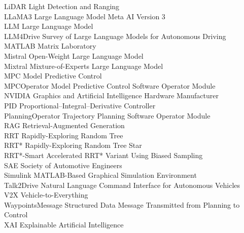 \documentclass[a4paper,12pt,one side]{report}
\theoremstyle{definition}
\begin{document}
\begin{tabbing}
LiDAR            \> Light Detection and Ranging \\[4pt]
LLaMA3           \> Large Language Model Meta AI Version 3 \\[4pt]
LLM              \> Large Language Model \\[4pt]
LLM4Drive        \> Survey of Large Language Models for Autonomous Driving \\[4pt]
MATLAB           \> Matrix Laboratory \\[4pt]
Mistral          \> Open-Weight Large Language Model \\[4pt]
Mixtral          \> Mixture-of-Experts Large Language Model \\[4pt]
MPC              \> Model Predictive Control \\[4pt]
MPCOperator      \> Model Predictive Control Software Operator Module \\[4pt]
NVIDIA           \> Graphics and Artificial Intelligence Hardware Manufacturer \\[4pt]
PID              \> Proportional--Integral--Derivative Controller \\[4pt]
PlanningOperator \> Trajectory Planning Software Operator Module \\[4pt]
RAG              \> Retrieval-Augmented Generation \\[4pt]
RRT              \> Rapidly-Exploring Random Tree \\[4pt]
RRT*             \> Rapidly-Exploring Random Tree Star \\[4pt]
RRT*-Smart       \> Accelerated RRT* Variant Using Biased Sampling \\[4pt]
SAE              \> Society of Automotive Engineers \\[4pt]
Simulink         \> MATLAB-Based Graphical Simulation Environment \\[4pt]
Talk2Drive       \> Natural Language Command Interface for Autonomous Vehicles \\[4pt]
V2X              \> Vehicle-to-Everything \\[4pt]
WaypointsMessage \> Structured Data Message Transmitted from Planning to Control \\[4pt]
XAI              \> Explainable Artificial Intelligence \\[4pt]
\end{tabbing}


\newpage
{}
\end{document}
